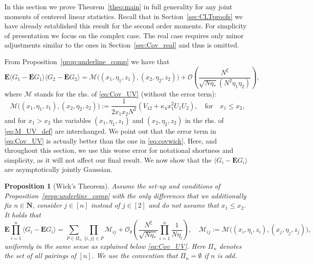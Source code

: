 \documentclass[10pt]{amsart}
\newtheorem{proposition}[theorem]{Proposition}
\numberwithin{equation}{section}
\newcommand{\E}{\mathbf{E}}
\newcommand{\N}{\mathbf{N}}
\begin{document}
In this section we prove Theorem~\ref{theo:main} in full generality for any joint moments of centered linear statistics. Recall that in Section~\ref{sec:CLTproofs} we have already established this result for the second order moments. For simplicity of presentation we focus on the complex case. The real case requires only minor adjustments similar to the ones in Section~\ref{sec:Cov_real} and thus is omitted.

From Proposition~\ref{prop:underline_comp} we have that
\begin{equation}
\label{eq:covwick}
\E\langle G_1-\E G_1\rangle\langle G_2-\E G_2\rangle=\mathcal{M}\big((x_1,\eta_1,z_1),(x_2,\eta_2,z_2)\big)+\mathcal{O}\left(\frac{N^\xi}{\sqrt{N\eta_*}(N^2\eta_1\eta_2)}\right),
\end{equation}
where $\mathcal{M}$ stands for the rhs. of \eqref{eq:Cov_UV} (without the error term):
\begin{equation}
\mathcal{M}\big((x_1,\eta_1,z_1),(x_2,\eta_2,z_2)\big):= \frac{1}{2x_1x_2N^2}\left(V_{12}+\kappa_4 x_1^2 U_1U_2\right),\quad \text{for}\quad x_1\le x_2,
\label{eq:M_UV_def}
\end{equation}
and for $x_1>x_2$ the variables $(x_1,\eta_1,z_1)$ and $(x_2,\eta_2,z_2)$ in the rhs. of  \eqref{eq:M_UV_def} are interchanged. We point out that the error term in \eqref{eq:Cov_UV} is actually better than the one in \eqref{eq:covwick}. Here, and throughout this section, we use this worse error for notational shortness and simplicity, as it will not affect our final result. We now show that the $\langle G_i-\E G_i\rangle$ are asymptotically jointly Gaussian.
\begin{proposition}[Wick's Theorem]\label{prop:Wick} Assume the set-up and conditions of Proposition~\ref{prop:underline_comp} with the only differences that we additionally fix $n\in\N$, consider $j\in[n]$ instead of $j\in[2]$ and do not assume that $x_1\le x_2$. It holds that
\begin{equation}
\label{eq:wickprod}
\E\prod_{i=1}^n\langle G_i-\E G_i\rangle=\sum_{P\in \Pi_n}\prod_{\{i,j\}\in P}\!\!\mathcal{M}_{ij}+\mathcal{O}_\theta\left(\frac{N^{\xi}}{\sqrt{N\eta_*}}\prod_{i=1}^n \frac{1}{N\eta_i} \right),\quad\mathcal{M}_{ij}:=\mathcal{M}\big((x_i,\eta_i,z_i),(x_j,\eta_j,z_j)\big),
\end{equation}
uniformly in the same sense as explained below \eqref{eq:Cov_UV}. Here $\Pi_n$ denotes the set of all pairings of $[n]$. We use the convention that $\Pi_n=\emptyset$ if $n$ is odd.
\end{proposition}
\end{document}
